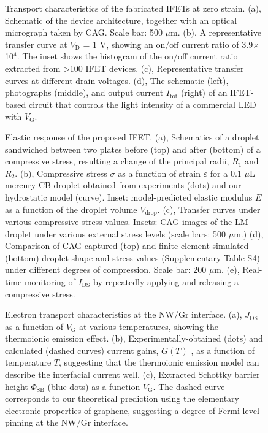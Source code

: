 \begin{figure}[htbp]
\centering
\caption{\label{fig:main-3}
Transport characteristics of the fabricated IFETs at zero strain. (a), Schematic of the device architecture, together with an optical micrograph taken by CAG. Scale bar: 500 \(\mu\)m. (b), A representative transfer curve at \(V_{\mathrm{D}}\) = 1 V, showing an on/off current ratio of 3.9\(\times{}\)10\(^{\text{4}}\). The inset shows the histogram of the on/off current ratio extracted from \textgreater{}100 IFET devices. (c), Representative transfer curves at different drain voltages. (d), The schematic (left), photographs (middle), and output current \(I_{\mathrm{tot}}\) (right) of an IFET-based circuit that controls the light intensity of a commercial LED with \(V_{\mathrm{G}}\).}
\end{figure}


\begin{figure}[htbp]
\centering
\caption{\label{fig:main-4}
Elastic response of the proposed IFET. (a), Schematics of a droplet sandwiched between two plates before (top) and after (bottom) of a compressive stress, resulting a change of the principal radii, \(R_{1}\) and \(R_{2}\). (b), Compressive stress \(\sigma\) as a function of strain \(\varepsilon\) for a 0.1 \(\mu\)L mercury CB droplet obtained from experiments (dots) and our hydrostatic model (curve). Inset: model-predicted elastic modulus \(E\) as a function of the droplet volume \(V_{\mathrm{drop}}\). (c), Transfer curves under various compressive stress values. Insets: CAG images of the LM droplet under various external stress levels (scale bars: 500 \(\mu\)m.) (d), Comparison of CAG-captured (top) and finite-element simulated (bottom) droplet shape and stress values (Supplementary Table S4) under different degrees of compression. Scale bar: 200 \(\mu\)m. (e), Real-time monitoring of \(I_{\mathrm{DS}}\) by repeatedly applying and releasing a compressive stress.}
\end{figure}


\begin{figure}[htbp]
\centering
\caption{\label{fig:main-5}
Electron transport characteristics at the NW/Gr interface. (a), \(J_{\mathrm{DS}}\) as a function of \(V_{\mathrm{G}}\) at various temperatures, showing the thermoionic emission effect. (b), Experimentally-obtained (dots) and calculated (dashed curves) current gains, \(G(T)\) , as a function of temperature \(T\), suggesting that the thermoionic emission model can describe the interfacial current well. (c), Extracted Schottky barrier height \(\Phi_{\mathrm{SB}}\) (blue dots) as a function \(V_{\mathrm{G}}\). The dashed curve corresponds to our theoretical prediction using the elementary electronic properties of graphene, suggesting a degree of Fermi level pinning at the NW/Gr interface.}
\end{figure}



